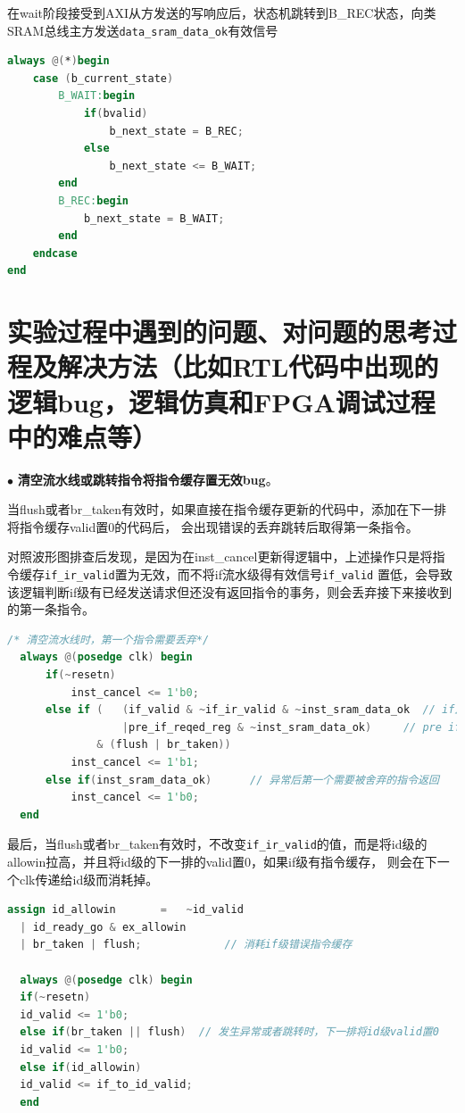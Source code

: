 \documentclass[11pt]{article}
\begin{document}
\begin{enumerate}
\begin{enumerate}
  在wait阶段接受到AXI从方发送的写响应后，状态机跳转到B\_REC状态，向类SRAM总线主方发送\verb|data_sram_data_ok|有效信号

  \begin{lstlisting}[language=verilog]
always @(*)begin
    case (b_current_state)
        B_WAIT:begin
            if(bvalid)
                b_next_state = B_REC;
            else 
                b_next_state <= B_WAIT;
        end
        B_REC:begin
            b_next_state = B_WAIT;
        end
    endcase
end
  \end{lstlisting}
\end{enumerate}

\end{enumerate}





\section{实验过程中遇到的问题、对问题的思考过程及解决方法（比如RTL代码中出现的逻辑bug，逻辑仿真和FPGA调试过程中的难点等）}

\noindent
$\bullet$
\textbf{清空流水线或跳转指令将指令缓存置无效bug}。

当flush或者br\_taken有效时，如果直接在指令缓存更新的代码中，添加在下一排将指令缓存valid置0的代码后，
会出现错误的丢弃跳转后取得第一条指令。

对照波形图排查后发现，是因为在inst\_cancel更新得逻辑中，上述操作只是将指令缓存\verb|if_ir_valid|置为无效，而不将if流水级得有效信号\verb|if_valid|
置低，会导致该逻辑判断if级有已经发送请求但还没有返回指令的事务，则会丢弃接下来接收到的第一条指令。

\begin{lstlisting}[language=verilog]
  /* 清空流水线时，第一个指令需要丢弃*/
  always @(posedge clk) begin
      if(~resetn)
          inst_cancel <= 1'b0;
      else if (   (if_valid & ~if_ir_valid & ~inst_sram_data_ok  // if正在等待指令返回
                  |pre_if_reqed_reg & ~inst_sram_data_ok)     // pre if 正在等待指令返回
              & (flush | br_taken))
          inst_cancel <= 1'b1;
      else if(inst_sram_data_ok)      // 异常后第一个需要被舍弃的指令返回
          inst_cancel <= 1'b0;
  end
\end{lstlisting}

最后，当flush或者br\_taken有效时，不改变\verb|if_ir_valid|的值，而是将id级的allowin拉高，并且将id级的下一排的valid置0，如果if级有指令缓存，
则会在下一个clk传递给id级而消耗掉。
\begin{lstlisting}[language=verilog]
  assign id_allowin       =   ~id_valid 
  | id_ready_go & ex_allowin 
  | br_taken | flush;             // 消耗if级错误指令缓存 
  
  always @(posedge clk) begin
  if(~resetn)
  id_valid <= 1'b0;
  else if(br_taken || flush)  // 发生异常或者跳转时，下一排将id级valid置0
  id_valid <= 1'b0;
  else if(id_allowin)
  id_valid <= if_to_id_valid;
  end
\end{lstlisting}     
\end{document}
